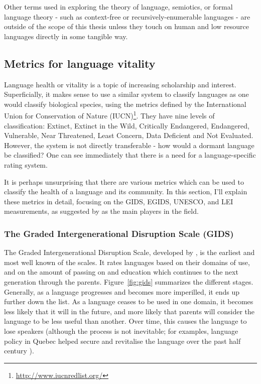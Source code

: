 Other terms used in exploring the theory of language, semiotics, or formal language theory - such as context-free or recursively-enumerable languages - are outside of the scope of this thesis unless they touch on human and low resource languages directly in some tangible way.

\subsection{Metrics for language vitality}
\label{subsec:metrics}

Language health or vitality is a topic of increasing scholarship and interest. Superficially, it makes sense to use a similar system to classify languages as one would classify biological species, using the metrics defined by the International Union for Conservation of Nature (IUCN)\footnote{\href{http://www.iucnredlist.org/}{http://www.iucnredlist.org/}}. They have nine levels of classification: Extinct, Extinct in the Wild, Critically Endangered, Endangered, Vulnerable, Near Threatened, Least Concern, Data Deficient and Not Evaluated. However, the system is not directly transferable - how would a dormant language be classified? One can see immediately that there is a need for a language-specific rating system.

It is perhaps unsurprising that there are various metrics which can be used to classify the health of a language and its community. In this section, I'll explain these metrics in detail, focusing on the GIDS, EGIDS, UNESCO, and LEI measurements, as suggested by \citet{yang2017toward} as the main players in the field.

\subsubsection{The Graded Intergenerational Disruption Scale (GIDS)}

The Graded Intergenerational Disruption Scale, developed by \citet{fishman1991reversing}, is the earliest and most well known of the scales. It rates languages based on their domains of use, and on the amount of passing on and education which continues to the next generation through the parents. Figure~\ref{fig:gids} summarizes the different stages. Generally, as a language progresses and becomes more imperilled, it ends up further down the list. As a language ceases to be used in one domain, it becomes less likely that it will in the future, and more likely that parents will consider the language to be less useful than another. Over time, this causes the language to lose speakers (although the process is not inevitable; for examples, language policy in Quebec helped secure and revitalise the language over the past half century \citep{bourhis2001reversing}).


